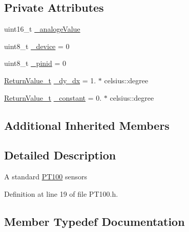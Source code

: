 \subsection*{Private Attributes}
\begin{DoxyCompactItemize}
\item 
uint16\+\_\+t \hyperlink{classo_cpt_1_1components_1_1sensors_1_1_p_t100_aeb98d92a8864ca202bcc7f382a6053c0}{\+\_\+analoge\+Value}
\item 
uint8\+\_\+t \hyperlink{classo_cpt_1_1components_1_1sensors_1_1_p_t100_af67b953bcfc2a50b211a36a6df5f311c}{\+\_\+device} = 0
\item 
uint8\+\_\+t \hyperlink{classo_cpt_1_1components_1_1sensors_1_1_p_t100_ac49f21dd8a8f2c7cd7e377512f5e9b25}{\+\_\+pinid} = 0
\item 
\hyperlink{classo_cpt_1_1components_1_1sensors_1_1_p_t100_a46c281d97bd4bd34e16f486a6aeda82e}{Return\+Value\+\_\+t} \hyperlink{classo_cpt_1_1components_1_1sensors_1_1_p_t100_a2789fca642c8948774378dc157599335}{\+\_\+dy\+\_\+dx} = 1. $\ast$ celsius\+::degree
\item 
\hyperlink{classo_cpt_1_1components_1_1sensors_1_1_p_t100_a46c281d97bd4bd34e16f486a6aeda82e}{Return\+Value\+\_\+t} \hyperlink{classo_cpt_1_1components_1_1sensors_1_1_p_t100_ab4c73209cb0b9daf21a8f8af2db17165}{\+\_\+constant} = 0. $\ast$ celsius\+::degree
\end{DoxyCompactItemize}
\subsection*{Additional Inherited Members}


\subsection{Detailed Description}
A standard \hyperlink{classo_cpt_1_1components_1_1sensors_1_1_p_t100}{P\+T100} sensors 

Definition at line 19 of file P\+T100.\+h.



\subsection{Member Typedef Documentation}
\hypertarget{classo_cpt_1_1components_1_1sensors_1_1_p_t100_a46c281d97bd4bd34e16f486a6aeda82e}{}\label{classo_cpt_1_1components_1_1sensors_1_1_p_t100_a46c281d97bd4bd34e16f486a6aeda82e} 
